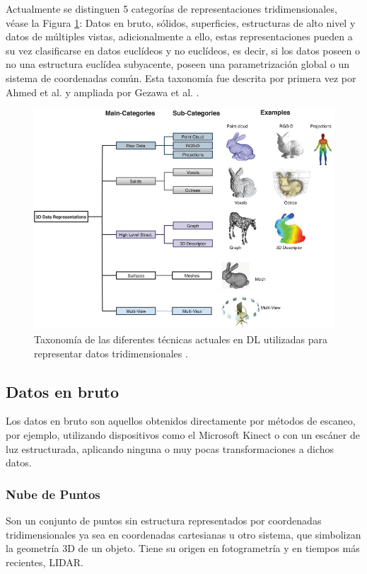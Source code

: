 Actualmente se distinguen 5 categorías de representaciones tridimensionales, véase la Figura \ref{fig:3dTaxonomy}: Datos en bruto, sólidos, superficies, estructuras de alto nivel y datos de múltiples vistas, adicionalmente a ello, estas representaciones pueden a su vez clasificarse en datos euclídeos y no euclídeos, es decir, si los datos poseen o no una estructura euclídea subyacente, poseen una parametrización global o un sistema de coordenadas común. Esta taxonomía fue descrita por primera vez por Ahmed et al. \cite{ahmed_survey_2019} y ampliada por Gezawa et al. \cite{gezawa_review_2020}.

\begin{figure}[h]
    \centering
    \includegraphics[width=\linewidth]{imagenes/theory/3Dtaxonomy.png}
    \caption[Taxonomía de las representaciones 3D para Deep Learning]{Taxonomía de las diferentes técnicas actuales en DL utilizadas para representar datos tridimensionales \cite{gezawa_review_2020}.}
    \label{fig:3dTaxonomy}
\end{figure}

\subsection{Datos en bruto}
Los datos en bruto son aquellos obtenidos directamente por métodos de escaneo, por ejemplo, utilizando dispositivos como el Microsoft Kinect o con un escáner de luz estructurada, aplicando ninguna o muy pocas transformaciones a dichos datos.

\subsubsection{Nube de Puntos}
Son un conjunto de puntos sin estructura representados por coordenadas tridimensionales ya sea en coordenadas cartesianas u otro sistema, que simbolizan la geometría 3D de un objeto. Tiene su origen en fotogrametría y en tiempos más recientes, LIDAR. 

